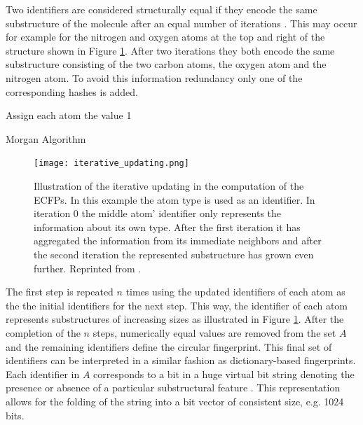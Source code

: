 Two identifiers are considered structurally equal if they encode the same substructure of the molecule after an equal number of iterations . This may occur for example for the nitrogen and oxygen atoms at the top and right of the structure shown in Figure \ref{fig:iteration_ECFP}. After two iterations they both encode the same substructure consisting of the two carbon atoms, the oxygen atom and the nitrogen atom. To avoid this information redundancy only one of the corresponding hashes is added.
\begin{algorithm}[t]
	\SetAlgoLined
	Assign each atom the value 1\;
	\caption{Morgan Algorithm}
	\label{algo:morgan}
\end{algorithm}
\begin{figure}[h]
	\centering 
	\texttt{[image: iterative\_updating.png]}
	\caption{Illustration of the iterative updating in the computation of the ECFPs. In this example the atom type is used as an identifier. In iteration 0 the middle atom' identifier only represents the information about its own type. After the first iteration it has aggregated the information from its immediate neighbors and after the second iteration the represented substructure has grown even further. Reprinted from \cite{ECFP}. }
	\label{fig:iteration_ECFP}
\end{figure}
The first step is repeated $n$ times using the updated identifiers of each atom as the the initial identifiers for the next step. This way, the identifier of each atom represents substructures of increasing sizes as illustrated in Figure \ref{fig:iteration_ECFP}. After the completion of the $n$ steps, numerically equal values are removed from the set $A$ and the remaining identifiers define the circular fingerprint. This final set of identifiers can be interpreted in a similar fashion as dictionary-based fingerprints. Each identifier in $A$ corresponds to a bit in a huge virtual bit string denoting the presence or absence of a particular substructural feature \citep{ecfp_bit}. This representation allows for the folding of the string into a bit vector of consistent size, e.g. 1024 bits. 


